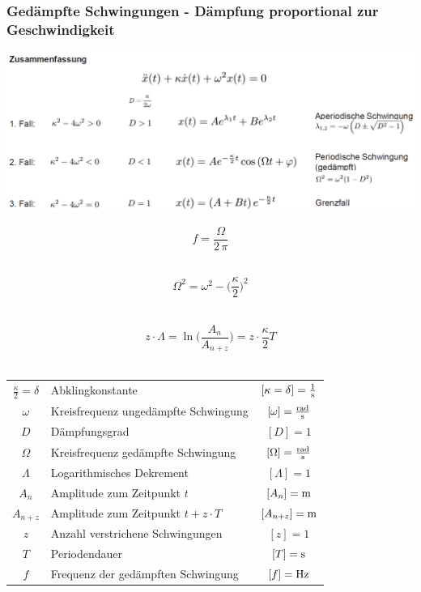 \subsubsection{Gedämpfte Schwingungen - Dämpfung proportional zur Geschwindigkeit}

\includegraphics[width=0.98\linewidth]{Bilder/Wellen-Optik/gedaempfte_schwingungen} \\

\begin{minipage}{0.23\linewidth}
$$ \boxed{ f = \frac{\Omega}{2 \, \pi} }$$ \\
\end{minipage}
\hfill
\begin{minipage}{0.23\linewidth}
$$ \boxed{ \Omega^2 =  \omega^2 - \Big(\frac{\kappa}{2} \Big)^2 }$$ \\
\end{minipage}
\hfill
\begin{minipage}{0.5\linewidth}
$$ \boxed{ z \cdot \Lambda = \ln \Big( \frac{A_n}{A_{n+z}} \Big) = z \cdot \frac{\kappa}{2} T }$$ \\
\end{minipage}


\begin{tabular}{c l c}
$\frac{\kappa}{2} = \delta$ & Abklingkonstante & $[\kappa = \delta] = \frac{1}{\mathrm{s}}$ \\
$\omega$ & Kreisfrequenz ungedämpfte Schwingung & $[\omega] = \frac{\mathrm{rad}}{\mathrm{s}}$ \\
$D$ & Dämpfungsgrad & $[D] = 1$ \\
$\Omega$ & Kreisfrequenz gedämpfte Schwingung & $[\Omega] = \frac{\mathrm{rad}}{\mathrm{s}}$ \\


$\Lambda$ & Logarithmisches Dekrement & $[\Lambda] = 1$ \\
$A_n$ & Amplitude zum Zeitpunkt $t$ & $[A_n] = \mathrm{m}$ \\
$A_{n+z}$ & Amplitude zum Zeitpunkt $t + z \cdot T$ & $[A_{n+z}] = \mathrm{m}$ \\
$z$ & Anzahl verstrichene Schwingungen & $[z] = 1$ \\
$T$ & Periodendauer & $[T] = \mathrm{s}$ \\
$f$ & Frequenz der gedämpften Schwingung & $[f] = \mathrm{Hz}$ 
\end{tabular}





